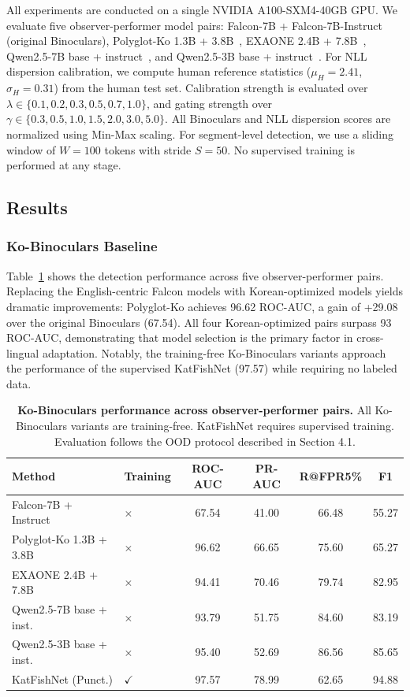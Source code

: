 \documentclass{article}
\begin{document}
All experiments are conducted on a single NVIDIA A100-SXM4-40GB GPU. We evaluate five observer-performer model pairs: Falcon-7B + Falcon-7B-Instruct~\cite{penedo2023falcon} (original Binoculars), Polyglot-Ko 1.3B + 3.8B~\cite{ko2023polyglot}, EXAONE 2.4B + 7.8B~\cite{lgai2024exaone}, Qwen2.5-7B base + instruct~\cite{yang2024qwen2}, and Qwen2.5-3B base + instruct~\cite{yang2024qwen2}. For NLL dispersion calibration, we compute human reference statistics ($\mu_H = 2.41$, $\sigma_H = 0.31$) from the human test set. Calibration strength is evaluated over $\lambda \in \{0.1, 0.2, 0.3, 0.5, 0.7, 1.0\}$, and gating strength over $\gamma \in \{0.3, 0.5, 1.0, 1.5, 2.0, 3.0, 5.0\}$. All Binoculars and NLL dispersion scores are normalized using Min-Max scaling. For segment-level detection, we use a sliding window of $W = 100$ tokens with stride $S = 50$. No supervised training is performed at any stage.

\subsection{Results}

\subsubsection{Ko-Binoculars Baseline}

Table~\ref{tab:model_pairs} shows the detection performance across five observer-performer pairs. Replacing the English-centric Falcon models with Korean-optimized models yields dramatic improvements: Polyglot-Ko achieves 96.62 ROC-AUC, a gain of +29.08 over the original Binoculars (67.54). All four Korean-optimized pairs surpass 93 ROC-AUC, demonstrating that model selection is the primary factor in cross-lingual adaptation. Notably, the training-free Ko-Binoculars variants approach the performance of the supervised KatFishNet (97.57) while requiring no labeled data.

\begin{table}[H]
\centering
\caption{\textbf{Ko-Binoculars performance across observer-performer pairs.} All Ko-Binoculars variants are training-free. KatFishNet requires supervised training. Evaluation follows the OOD protocol described in Section 4.1.}
\label{tab:model_pairs}
\begin{tabular}{llcccc}
\toprule
Method & Training & ROC-AUC & PR-AUC & R@FPR5\% & F1 \\
\midrule
Falcon-7B + Instruct & $\times$ & 67.54 & 41.00 & 66.48 & 55.27 \\
Polyglot-Ko 1.3B + 3.8B & $\times$ & 96.62 & 66.65 & 75.60 & 65.27 \\
EXAONE 2.4B + 7.8B & $\times$ & 94.41 & 70.46 & 79.74 & 82.95 \\
Qwen2.5-7B base + inst. & $\times$ & 93.79 & 51.75 & 84.60 & 83.19 \\
Qwen2.5-3B base + inst. & $\times$ & 95.40 & 52.69 & 86.56 & 85.65 \\
\midrule
KatFishNet (Punct.) & $\checkmark$ & 97.57 & 78.99 & 62.65 & 94.88 \\
\bottomrule
\end{tabular}
\end{table}
\end{document}
